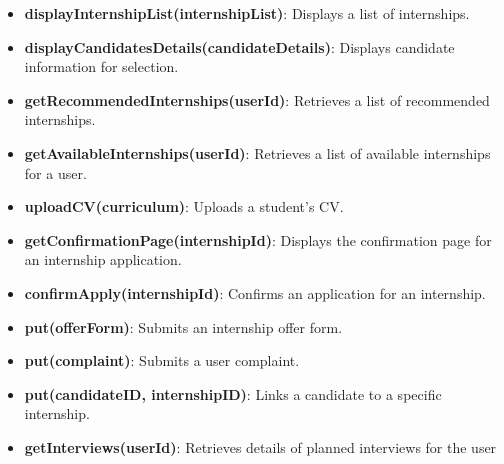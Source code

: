 \begin{itemize}
    \item \textbf{displayInternshipList(internshipList)}: Displays a list of internships.
    \item \textbf{displayCandidatesDetails(candidateDetails)}: Displays candidate information for selection.
    \item \textbf{getRecommendedInternships(userId)}: Retrieves a list of recommended internships.
    \item \textbf{getAvailableInternships(userId)}: Retrieves a list of available internships for a user.
    \item \textbf{uploadCV(curriculum)}: Uploads a student's CV.
    \item \textbf{getConfirmationPage(internshipId)}: Displays the confirmation page for an internship application.
    \item \textbf{confirmApply(internshipId)}: Confirms an application for an internship.
    \item \textbf{put(offerForm)}: Submits an internship offer form.
    \item \textbf{put(complaint)}: Submits a user complaint.
    \item \textbf{put(candidateID, internshipID)}: Links a candidate to a specific internship.
    \item \textbf{getInterviews(userId)}: Retrieves details of planned interviews for the user
\end{itemize}

